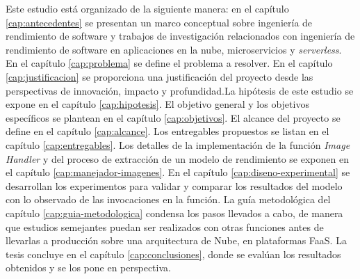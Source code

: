 Este estudio está organizado de la siguiente manera: en el capítulo \ref{cap:antecedentes} se presentan un marco conceptual sobre ingeniería de rendimiento de software y trabajos de investigación relacionados con ingeniería de rendimiento de software en aplicaciones en la nube, microservicios y \emph{serverless}. En el capítulo \ref{cap:problema} se define el problema a resolver. En el capítulo \ref{cap:justificacion} se proporciona una justificación del proyecto desde las perspectivas de innovación, impacto y profundidad.La hipótesis de este estudio se expone en el capítulo \ref{cap:hipotesis}.  El objetivo general y los objetivos específicos se plantean en el capítulo \ref{cap:objetivos}. El alcance del proyecto se define en el capítulo \ref{cap:alcance}. Los entregables propuestos se listan en el capítulo \ref{cap:entregables}. Los detalles de la implementación de la función \emph{Image Handler} y del proceso de extracción de un modelo de rendimiento se exponen en el capítulo \ref{cap:manejador-imagenes}. En el capítulo \ref{cap:diseno-experimental} se desarrollan los experimentos para validar y comparar los resultados del modelo con lo observado de las invocaciones en la función. La guía metodológica del capítulo \ref{cap:guia-metodologica} condensa los pasos llevados a cabo, de manera que estudios semejantes puedan ser realizados con otras funciones antes de llevarlas a producción sobre una arquitectura de Nube, en plataformas FaaS. La tesis concluye en el capítulo \ref{cap:conclusiones}, donde se evalúan los resultados obtenidos y se los pone en perspectiva.



